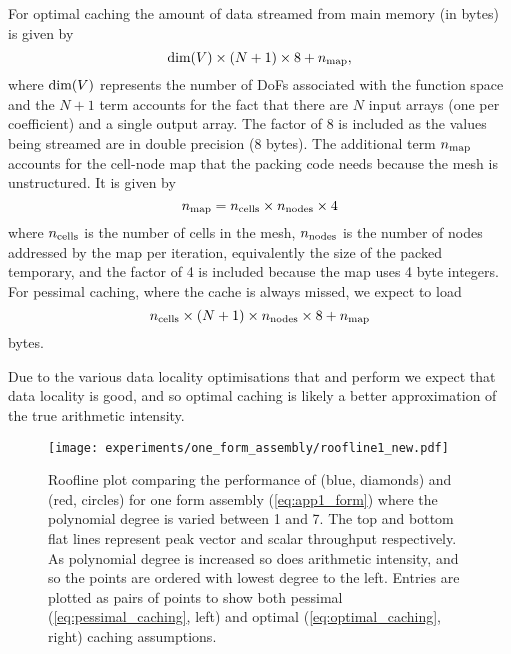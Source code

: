 \documentclass[thesis]{subfiles}
\begin{document}
For optimal caching the amount of data streamed from main memory (in bytes) is given by
\begin{equation}
  \label{eq:optimal_caching}
  \textnormal{dim}(V) \times (N + 1) \times 8 + n_{\textnormal{map}},
\end{equation}
where $\textnormal{dim}(V)$ represents the number of DoFs associated with the function space and the $N+1$ term accounts for the fact that there are $N$ input arrays (one per coefficient) and a single output array.
The factor of 8 is included as the values being streamed are in double precision (8 bytes).
The additional term $n_{\textnormal{map}}$ accounts for the cell-node map that the packing code needs because the mesh is unstructured.
It is given by
\begin{equation}
  n_{\textnormal{map}} = n_{\textnormal{cells}} \times n_{\textnormal{nodes}} \times 4
\end{equation}
where $n_{\textnormal{cells}}$ is the number of cells in the mesh, $n_{\textnormal{nodes}}$ is the number of nodes addressed by the map per iteration, equivalently the size of the packed temporary, and the factor of 4 is included because the map uses 4 byte integers.
For pessimal caching, where the cache is always missed, we expect to load
\begin{equation}
  \label{eq:pessimal_caching}
  n_{\textnormal{cells}} \times (N + 1) \times n_{\textnormal{nodes}} \times 8 + n_{\textnormal{map}}
\end{equation}
bytes.

Due to the various data locality optimisations that  and  perform we expect that data locality is good, and so optimal caching is likely a better approximation of the true arithmetic intensity.

\begin{figure}
  \centering
  \texttt{[image: experiments/one\_form\_assembly/roofline1\_new.pdf]}
  \caption{
    Roofline plot comparing the performance of  (blue, diamonds) and  (red, circles) for one form assembly (\cref{eq:app1_form}) where the polynomial degree is varied between 1 and 7.
    The top and bottom flat lines represent peak vector and scalar throughput respectively.
    As polynomial degree is increased so does arithmetic intensity, and so the points are ordered with lowest degree to the left.
    Entries are plotted as pairs of points to show both pessimal (\cref{eq:pessimal_caching}, left) and optimal (\cref{eq:optimal_caching}, right) caching assumptions.
  }
  \label{fig:app1_roofline1}
\end{figure}
\end{document}
